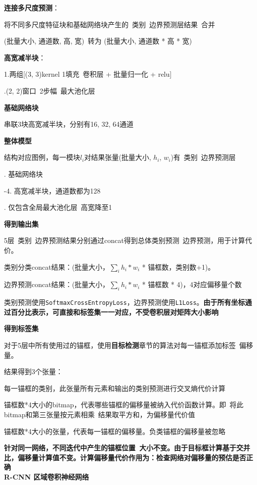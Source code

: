\documentclass[UTF8]{ctexart}
\begin{document}
  \textbf{连接多尺度预测}：

  \quad 将不同多尺度特征块和基础网络块产生的\ 类别\ 边界预测层结果\ 合并
  
  \quad (批量大小, 通道数, 高, 宽)\ 转为 (批量大小, 通道数 * 高 * 宽)
  
  \textbf{高宽减半块}：

  \quad 1.两组[(3, 3)kernel 1填充\ 卷积层 + 批量归一化 + relu]
  
  .(2, 2)窗口\ 2步幅\ 最大池化层

  \textbf{基础网络块}

  串联3块高宽减半块，分别有16, 32, 64通道

  \textbf{整体模型}
  
  \quad 结构对应图例，每一模块$l_i$对结果张量(批量大小, $h_i$, $w_i$)有\ 类别\ 边界预测层

  . 基础网络块

  -4. 高宽减半块，通道数都为128

  . 仅包含全局最大池化层\ 高宽降至1

  \quad \textbf{得到输出集}

  \quad \quad 5层\ 类别\ 边界预测结果分别通过concat得到总体类别预测\ 边界预测，用于计算代价。

  \quad \quad \quad 类别分类concat结果：(批量大小，$\sum_i h_i * w_i$ * 锚框数，类别数+1)。

  \quad \quad \quad 边界预测concat结果：(批量大小，$\sum_i h_i * w_i$ * 锚框数 * 4)，4对应偏移量个数
  
  \quad \quad 类别预测使用\texttt{SoftmaxCrossEntropyLoss}，边界预测使用\texttt{L1Loss}。\textbf{由于所有坐标通过百分比表示，可直接和标签集一一对应，不受卷积层对矩阵大小影响}

  \quad \textbf{得到标签集}

  \quad \quad 对于5层中所有使用过的锚框，使用\textbf{目标检测}章节的算法对每一锚框添加标签\ 偏移量。
  
  \quad \quad 结果得到3个张量：
  
  \quad \quad \quad 每一锚框的类别，此张量所有元素和输出的类别预测进行交叉熵代价计算
  
  \quad \quad \quad 锚框数*4大小的bitmap，代表哪些锚框的偏移量被纳入代价函数计算。即\ 将此bitmap和第三张量按元素相乘\ 结果取平方和，为偏移量代价值
  
  \quad \quad \quad 锚框数*4大小的张量，代表每一锚框的偏移量。负类锚框的偏移量被忽略
  
  \quad \quad \quad \textbf{针对同一网络，不同迭代中产生的锚框位置\ 大小不变。由于目标框计算基于交并比，偏移量计算值不变。计算偏移量代价作用为：检查网络对偏移量的预估是否正确}\\
\textbf{R-CNN 区域卷积神经网络}
\end{document}
